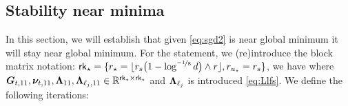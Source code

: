 \subsection{Stability near minima}
In this section, we will establish that given \eqref{eq:sgd2} is near global minimum it will stay near global minimum.  For the statement, we (re)introduce the block matrix notation: $\mathsf{rk}_{\star} =   \{ r_{\star} = 
\lfloor  r_s \big(1 -  \log^{\nicefrac{-1}{8}} d \big) \wedge r \rfloor, r_{u_\star} =  r_s  \}$, we have 
where   $\boldsymbol{G}_{t,11} ,   \boldsymbol{\nu}_{t,11},  \boldsymbol{\Lambda}_{11},  \boldsymbol{\Lambda}_{\ell_j, 11}  \in \mathbb{R}^{\mathsf{rk}_{\star}  \times \mathsf{rk}_{\star} }$ and $ \boldsymbol{\Lambda}_{\ell_j}$ is introduced   \eqref{eq:Llfs}.  We define the following iterations:
